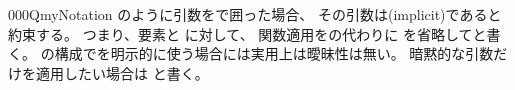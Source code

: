 \documentclass[index]{subfiles}
\begin{document}
\begin{myBlock}{000Q}{myNotation}
  のように引数をで囲った場合、
  その引数は(implicit)であると約束する。
  つまり、要素と
  に対して、
  関数適用をの代わりに
  を省略してと書く。
  の構成でを明示的に使う場合には実用上は曖昧性は無い。
  暗黙的な引数だけを適用したい場合は
  と書く。
\end{myBlock}
\end{document}
